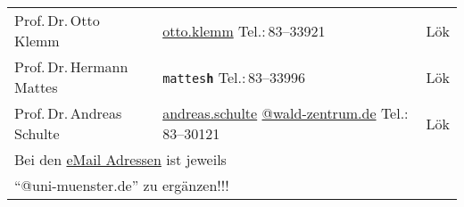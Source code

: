 \begin{small}
\begin{longtable}{p{} p{} p{}}
  Prof.\,Dr.\,Otto Klemm & \url{otto.klemm} \newline Tel.:\,83--33921 & Lök\\
  Prof.\,Dr.\,Hermann Mattes & \texttt{mattes\textbf{h}} \newline Tel.:\,83--33996 & Lök\\
  Prof.\,Dr.\,Andreas Schulte & \url{andreas.schulte} \newline \url{@wald-zentrum.de} \newline Tel.:\,83--30121 & Lök\\ 
 \hline
  \multicolumn{3}{l}{Bei den \url{eMail Adressen} ist jeweils} \\
  \multicolumn{3}{l}{``@uni-muenster.de'' zu ergänzen!!!}\\
\end{longtable}
\end{small}


